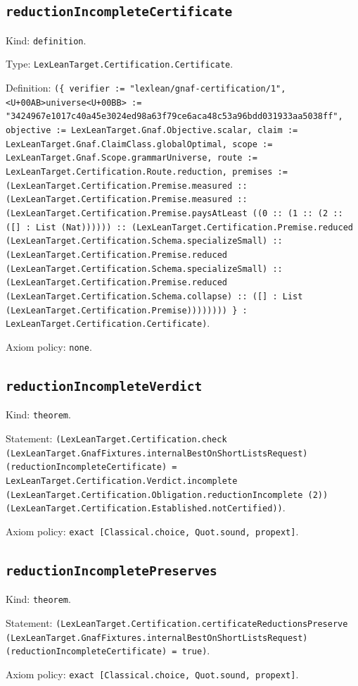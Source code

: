 \documentclass[11pt]{article}
\begin{document}
\subsection*{\texttt{reductionIncompleteCertificate}}
\noindent Kind: \texttt{definition}.\par
\noindent Type: \texttt{LexLeanTarget.Certification.Certificate}.\par
\noindent Definition: \texttt{(\{ verifier := "lexlean/gnaf-certification/1", <U+00AB>universe<U+00BB> := "3424967e1017c40a45e3024ed98a63f79ce6aca48c53a96bdd031933aa5038ff", objective := LexLeanTarget.Gnaf.Objective.scalar, claim := LexLeanTarget.Gnaf.ClaimClass.globalOptimal, scope := LexLeanTarget.Gnaf.Scope.grammarUniverse, route := LexLeanTarget.Certification.Route.reduction, premises := (LexLeanTarget.Certification.Premise.measured :: (LexLeanTarget.Certification.Premise.measured :: (LexLeanTarget.Certification.Premise.paysAtLeast ((0 :: (1 :: (2 :: ([] : List (Nat)))))) :: (LexLeanTarget.Certification.Premise.reduced (LexLeanTarget.Certification.Schema.specializeSmall) :: (LexLeanTarget.Certification.Premise.reduced (LexLeanTarget.Certification.Schema.specializeSmall) :: (LexLeanTarget.Certification.Premise.reduced (LexLeanTarget.Certification.Schema.collapse) :: ([] : List (LexLeanTarget.Certification.Premise)))))))) \} : LexLeanTarget.Certification.Certificate)}.\par
\noindent Axiom policy: \texttt{none}.\par
\subsection*{\texttt{reductionIncompleteVerdict}}
\noindent Kind: \texttt{theorem}.\par
\noindent Statement: \texttt{(LexLeanTarget.Certification.check (LexLeanTarget.GnafFixtures.internalBestOnShortListsRequest) (reductionIncompleteCertificate) = LexLeanTarget.Certification.Verdict.incomplete (LexLeanTarget.Certification.Obligation.reductionIncomplete (2)) (LexLeanTarget.Certification.Established.notCertified))}.\par
\noindent Axiom policy: \texttt{exact [Classical.choice, Quot.sound, propext]}.\par
\subsection*{\texttt{reductionIncompletePreserves}}
\noindent Kind: \texttt{theorem}.\par
\noindent Statement: \texttt{(LexLeanTarget.Certification.certificateReductionsPreserve (LexLeanTarget.GnafFixtures.internalBestOnShortListsRequest) (reductionIncompleteCertificate) = true)}.\par
\noindent Axiom policy: \texttt{exact [Classical.choice, Quot.sound, propext]}.\par
\end{document}
